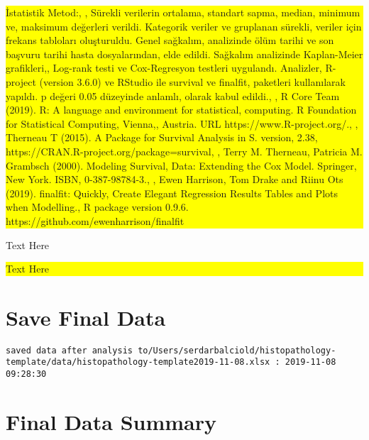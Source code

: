 \documentclass[]{article}
\begin{document}
\colorbox{yellow}{
\parbox{\dimexpr\linewidth-2\fboxsep}{

İstatistik Metod:, , Sürekli verilerin ortalama, standart sapma, median, minimum ve, maksimum değerleri verildi. Kategorik veriler ve gruplanan sürekli, veriler için frekans tabloları oluşturuldu. Genel sağkalım, analizinde ölüm tarihi ve son başvuru tarihi hasta dosyalarından, elde edildi.  Sağkalım analizinde Kaplan-Meier grafikleri,, Log-rank testi ve Cox-Regresyon testleri uygulandı. Analizler, R-project (version 3.6.0) ve RStudio ile survival ve finalfit, paketleri kullanılarak yapıldı. p değeri 0.05 düzeyinde anlamlı, olarak kabul edildi., , R Core Team (2019). R: A language and environment for statistical, computing. R Foundation for Statistical Computing, Vienna,, Austria. URL https://www.R-project.org/., , Therneau T (2015). A Package for Survival Analysis in S. version, 2.38, https://CRAN.R-project.org/package=survival, , Terry M. Therneau, Patricia M. Grambsch (2000). Modeling Survival, Data: Extending the Cox Model. Springer, New York. ISBN, 0-387-98784-3., , Ewen Harrison, Tom Drake and Riinu Ots (2019). finalfit: Quickly, Create Elegant Regression Results Tables and Plots when Modelling., R package version 0.9.6. https://github.com/ewenharrison/finalfit

}
}

\pagebreak

Text Here

\noindent

\colorbox{yellow}{
\parbox{\dimexpr\linewidth-2\fboxsep}{

Text Here

}
}

\pagebreak

\pagecolor{yellow}\afterpage{\nopagecolor}

\pagebreak

\pagebreak

\hypertarget{save-final-data}{%
\section{Save Final Data}\label{save-final-data}}

\begin{verbatim}
saved data after analysis to/Users/serdarbalciold/histopathology-template/data/histopathology-template2019-11-08.xlsx : 2019-11-08 09:28:30
\end{verbatim}

\pagebreak

\hypertarget{final-data-summary}{%
\section{Final Data Summary}\label{final-data-summary}}
\end{document}
